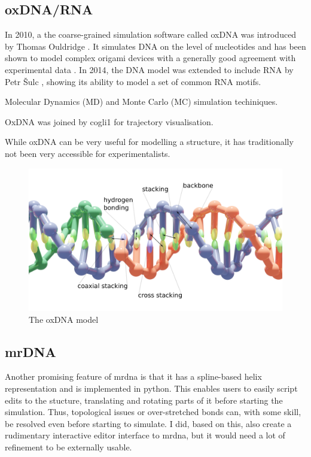 \subsection{oxDNA/RNA}
In 2010, a the coarse-grained simulation software called oxDNA was introduced by Thomas Ouldridge \cite{ouldridge2010dna}. It simulates DNA on the level of nucleotides and has been shown to model complex origami devices with a generally good agreement with experimental data \cite{sharma2017characterizing}. In 2014, the DNA model was extended to include RNA by Petr {\v{S}}ulc \cite{vsulc2014nucleotide}, showing its ability to model a set of common RNA motifs. 

Molecular Dynamics (MD) and Monte Carlo (MC) simulation techiniques.

OxDNA was joined by cogli1 for trajectory visualisation.



While oxDNA can be very useful for modelling a structure, it has traditionally not been very accessible for experimentalists. %

\begin{figure}[h]
\begin{center}
    \includegraphics[width=\textwidth]{figures/oxdna_annot.png}
    \caption{The oxDNA model}
    \label{fig_oxDNA}
    \end{center}
\end{figure}

\subsection{mrDNA}
Another promising feature of mrdna is that it has a spline-based helix representation and is implemented in python. This enables users to easily script edits to the stucture, translating and rotating parts of it before starting the simulation. Thus, topological issues or over-stretched bonds can, with some skill, be resolved even before starting to simulate. I did, based on this, also create a rudimentary interactive editor interface to mrdna, but it would need a lot of refinement to be externally usable.

